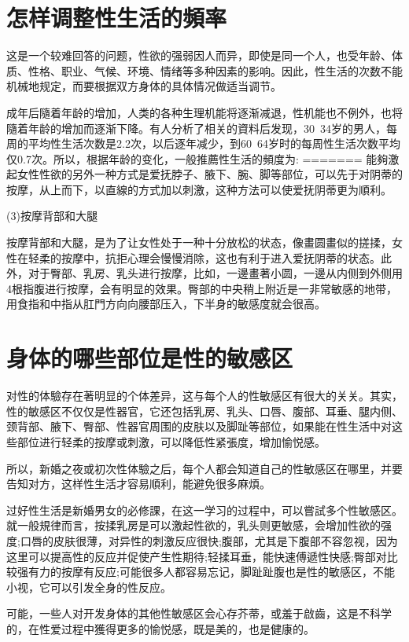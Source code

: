 \documentclass[12pt,UTF8]{ctexbook}
\begin{document}
\section{怎样调整性生活的頻率}

这是一个较难回答的问题，性欲的强弱因人而异，即使是同一个人，也受年龄、体质、性格、职业、气候、环境、情绪等多种因素的影响。因此，性生活的次数不能机械地规定，而要根据双方身体的具体情况做适当调节。

成年后隨着年龄的增加，人类的各种生理机能将逐渐减退，性机能也不例外，也将隨着年龄的增加而逐渐下降。有人分析了相关的資料后发现，30~34岁的男人，每周的平均性生活次数是2.2次，以后逐年减少，到60~64岁时的每周性生活次数平均仅0.7次。所以，根据年龄的变化，一般推薦性生活的頻度为:
=======
能夠激起女性性欲的另外一种方式是爱抚脖子、腋下、腕、脚等部位，可以先于对阴蒂的按摩，从上而下，以直線的方式加以刺激，这种方法可以使爱抚阴蒂更为順利。

(3)按摩背部和大腿

按摩背部和大腿，是为了让女性处于一种十分放松的状态，像畫圆畫似的搓揉，女性在轻柔的按摩中，抗拒心理会慢慢消除，这也有利于进入爱抚阴蒂的状态。此外，对于臀部、乳房、乳头进行按摩，比如，一邊畫著小圆，一邊从内侧到外侧用4根指腹进行按摩，会有明显的效果。臀部的中央稍上附近是一非常敏感的地带，用食指和中指从肛門方向向腰部压入，下半身的敏感度就会很高。

\section{身体的哪些部位是性的敏感区}

对性的体驗存在著明显的个体差异，这与每个人的性敏感区有很大的关关。其实，性的敏感区不仅仅是性器官，它还包括乳房、乳头、口唇、腹部、耳垂、腿内侧、颈背部、腋下、臀部、性器官周围的皮肤以及脚趾等部位，如果能在性生活中对这些部位进行轻柔的按摩或刺激，可以降低性紧張度，增加愉悦感。

所以，新婚之夜或初次性体驗之后，每个人都会知道自己的性敏感区在哪里，并要告知对方，这样性生活才容易順利，能避免很多麻煩。

过好性生活是新婚男女的必修課，在这一学习的过程中，可以嘗試多个性敏感区。就一般規律而言，按揉乳房是可以激起性欲的，乳头则更敏感，会增加性欲的强度;口唇的皮肤很薄，对异性的刺激反应很快;腹部，尤其是下腹部不容忽视，因为这里可以提高性的反应并促使产生性期待;轻揉耳垂，能快速傅遞性快感;臀部对比较强有力的按摩有反应;可能很多人都容易忘记，脚趾趾腹也是性的敏感区，不能小视，它可以引发全身的性反应。

可能，一些人对开发身体的其他性敏感区会心存芥蒂，或羞于啟齒，这是不科学的，在性爱过程中獲得更多的愉悦感，既是美的，也是健康的。
\end{document}
